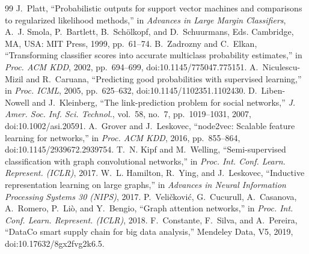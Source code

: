 \documentclass[conference]{IEEEtran}
\begin{document}
\begin{thebibliography}{99}
 J.~Platt, ``Probabilistic outputs for support vector machines and comparisons to regularized likelihood methods,'' in \emph{Advances in Large Margin Classifiers}, A.~J. Smola, P.~Bartlett, B.~Sch\"{o}lkopf, and D.~Schuurmans, Eds. Cambridge, MA, USA: MIT Press, 1999, pp.~61--74.
 B.~Zadrozny and C.~Elkan, ``Transforming classifier scores into accurate multiclass probability estimates,'' in \emph{Proc. ACM KDD}, 2002, pp.~694--699, doi:10.1145/775047.775151.
 A.~Niculescu-Mizil and R.~Caruana, ``Predicting good probabilities with supervised learning,'' in \emph{Proc. ICML}, 2005, pp.~625--632, doi:10.1145/1102351.1102430.
 D.~Liben-Nowell and J.~Kleinberg, ``The link-prediction problem for social networks,'' \emph{J. Amer. Soc. Inf. Sci. Technol.}, vol.~58, no.~7, pp.~1019--1031, 2007, doi:10.1002/asi.20591.
 A.~Grover and J.~Leskovec, ``node2vec: Scalable feature learning for networks,'' in \emph{Proc. ACM KDD}, 2016, pp.~855--864, doi:10.1145/2939672.2939754.
 T.~N. Kipf and M.~Welling, ``Semi-supervised classification with graph convolutional networks,'' in \emph{Proc. Int. Conf. Learn. Represent. (ICLR)}, 2017.
 W.~L. Hamilton, R.~Ying, and J.~Leskovec, ``Inductive representation learning on large graphs,'' in \emph{Advances in Neural Information Processing Systems 30 (NIPS)}, 2017.
 P.~Veli\v{c}kovi\'{c}, G.~Cucurull, A.~Casanova, A.~Romero, P.~Li\`{o}, and Y.~Bengio, ``Graph attention networks,'' in \emph{Proc. Int. Conf. Learn. Represent. (ICLR)}, 2018.
 F.~Constante, F.~Silva, and A.~Pereira, ``DataCo smart supply chain for big data analysis,'' Mendeley Data, V5, 2019, doi:10.17632/8gx2fvg2k6.5.
\end{thebibliography}
\end{document}
